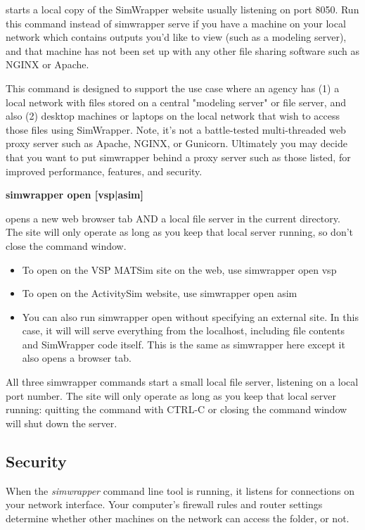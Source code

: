 starts a local copy of the SimWrapper website usually listening on port 8050. Run this command instead of simwrapper serve if you have a machine on your local network which contains outputs you'd like to view (such as a modeling server), and that machine has not been set up with any other file sharing software such as NGINX or Apache.

    This command is designed to support the use case where an agency has (1) a local network with files stored on a central "modeling server" or file server, and also (2) desktop machines or laptops on the local network that wish to access those files using SimWrapper.
    Note, it's not a battle-tested multi-threaded web proxy server such as Apache, NGINX, or Gunicorn. Ultimately you may decide that you want to put simwrapper behind a proxy server such as those listed, for improved performance, features, and security.

\noindent\textbf{simwrapper open [vsp|asim]}

opens a new web browser tab AND a local file server in the current directory. The site will only operate as long as you keep that local server running, so don't close the command window.

\begin{itemize}
  \tightlist
  \item
    To open on the VSP MATSim site on the web, use simwrapper open vsp
  \item
    To open on the ActivitySim website, use simwrapper open asim
  \item
    You can also run simwrapper open without specifying an external site. In this case, it will will serve everything from the localhost, including file contents and SimWrapper code itself. This is the same as simwrapper here except it also opens a browser tab.
\end{itemize}

All three simwrapper commands start a small local file server, listening on a local port number. The site will only operate as long as you keep that local server running: quitting the command with CTRL-C or closing the command window will shut down the server.

\subsection{Security}

When the \emph{simwrapper} command line tool is running, it listens for connections on your network interface. Your computer's firewall rules and router settings determine whether other machines on the network can access the folder, or not.

